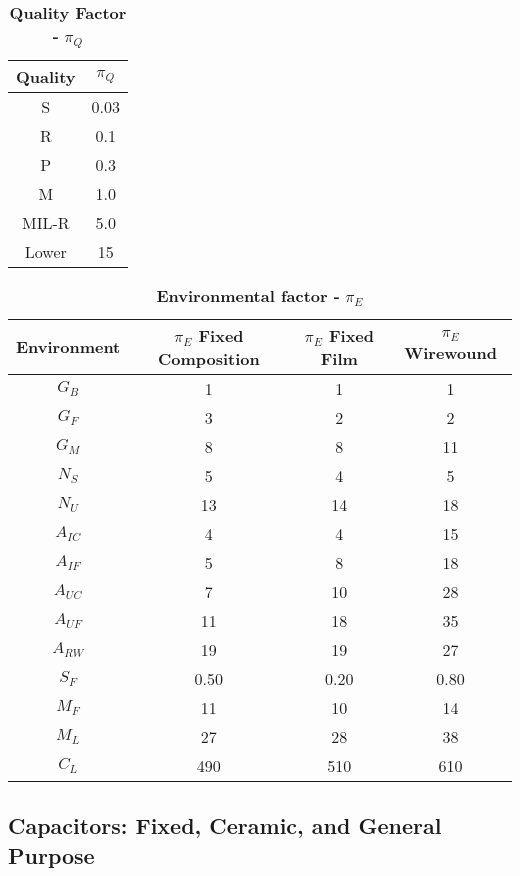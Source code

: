 \begin{table}[h]
\caption{\textbf{Quality Factor -} $\pi_{Q}$}
\label{table:qualityFactor}
\begin{tabular}{|c|c|} \hline
\rowcolor{Gray}
\textbf{Quality} & $\pi_{Q}$ \\ \hline
S & 0.03 \\ \hline
R & 0.1 \\ \hline
P & 0.3 \\ \hline
M & 1.0 \\ \hline
MIL-R & 5.0 \\ \hline
Lower & 15 \\ \hline
\end{tabular}
\end{table}


\begin{table}[h]
\caption{\textbf{Environmental factor -} $\pi_{E}$}
\label{table:environmentalFactor}
\begin{tabular}{|c|c|c|c|} \hline
\rowcolor{Gray}
\textbf{Environment} & $\pi_{E}$  \textbf{Fixed Composition} & $\pi_{E}$  \textbf{Fixed Film} & $\pi_{E}$  \textbf{Wirewound} \\ \hline
$G_{B}$ & 1 & 1 & 1 \\  \hline
$G_{F}$ & 3 & 2 & 2 \\ \hline
$G_{M}$ & 8 & 8 & 11 \\ \hline
$N_{S}$ & 5 & 4 & 5 \\ \hline
$N_{U}$ & 13 & 14 & 18 \\ \hline
$A_{IC}$ & 4 & 4 & 15 \\ \hline
$A_{IF}$ & 5 & 8 & 18 \\ \hline
$A_{UC}$ & 7 & 10 & 28 \\ \hline
$A_{UF}$ & 11 & 18 & 35 \\ \hline
$A_{RW}$ & 19 & 19 & 27 \\ \hline
$S_{F}$ & 0.50 & 0.20 & 0.80 \\ \hline
$M_{F}$ & 11 & 10 & 14 \\ \hline
$M_{L}$ & 27 & 28 & 38 \\ \hline
$C_{L}$ & 490 & 510 & 610 \\ \hline
\end{tabular}
\end{table}

\newpage

\subsection{Capacitors: Fixed, Ceramic, and General Purpose}
\label{subsection:capacitors-fixed-ceramic-and-general-purpose}

